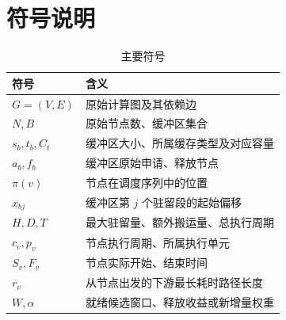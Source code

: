 \section{符号说明}
\begin{table}[H]\centering\caption{主要符号}\begin{tabular}{ll}\toprule
符号 & 含义\\\midrule
$G=(V,E)$ & 原始计算图及其依赖边\\
$N,B$ & 原始节点数、缓冲区集合\\
$s_b,t_b,C_t$ & 缓冲区大小、所属缓存类型及对应容量\\
$a_b,f_b$ & 缓冲区原始申请、释放节点\\
$\pi(v)$ & 节点在调度序列中的位置\\
$x_{bj}$ & 缓冲区第 $j$ 个驻留段的起始偏移\\
$H,D,T$ & 最大驻留量、额外搬运量、总执行周期\\
$c_v,p_v$ & 节点执行周期、所属执行单元\\
$S_v,F_v$ & 节点实际开始、结束时间\\
$r_v$ & 从节点出发的下游最长耗时路径长度\\
$W,\alpha$ & 就绪候选窗口、释放收益或新增量权重\\\bottomrule
\end{tabular}\end{table}
